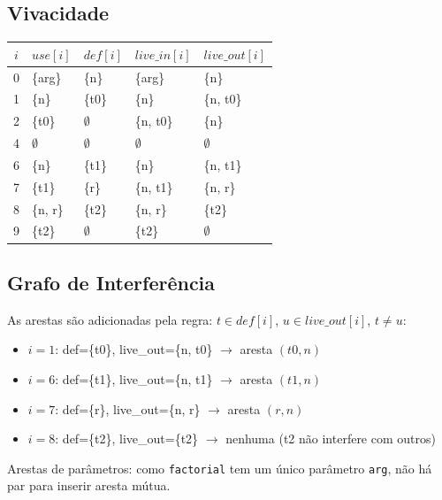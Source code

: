 \subsection{Vivacidade}

\begin{center}
  \begin{tabular}{cllll}
    \toprule
    $i$ & $\mathit{use}[i]$ & $\mathit{def}[i]$ &
    $\mathit{live\_in}[i]$ & $\mathit{live\_out}[i]$ \\
    \midrule
    0 & \{arg\}    & \{n\}  & \{arg\}    & \{n\}       \\
    1 & \{n\}      & \{t0\} & \{n\}      & \{n, t0\}   \\
    2 & \{t0\}     & $\emptyset$ & \{n, t0\} & \{n\}  \\
    4 & $\emptyset$ & $\emptyset$ & $\emptyset$ & $\emptyset$ \\
    6 & \{n\}      & \{t1\} & \{n\}      & \{n, t1\}   \\
    7 & \{t1\}     & \{r\}  & \{n, t1\}  & \{n, r\}    \\
    8 & \{n, r\}   & \{t2\} & \{n, r\}   & \{t2\}      \\
    9 & \{t2\}     & $\emptyset$ & \{t2\} & $\emptyset$ \\
    \bottomrule
  \end{tabular}
\end{center}

\subsection{Grafo de Interferência}

As arestas são adicionadas pela regra: $t \in \mathit{def}[i]$,
$u \in \mathit{live\_out}[i]$, $t \neq u$:

\begin{itemize}
  \item $i=1$: def=\{t0\}, live\_out=\{n, t0\} $\to$ aresta $(t0, n)$
  \item $i=6$: def=\{t1\}, live\_out=\{n, t1\} $\to$ aresta $(t1, n)$
  \item $i=7$: def=\{r\}, live\_out=\{n, r\} $\to$ aresta $(r, n)$
  \item $i=8$: def=\{t2\}, live\_out=\{t2\} $\to$ nenhuma (t2 não
    interfere com outros)
\end{itemize}

Arestas de parâmetros: como \texttt{factorial} tem um único parâmetro
\texttt{arg}, não há par para inserir aresta mútua.

